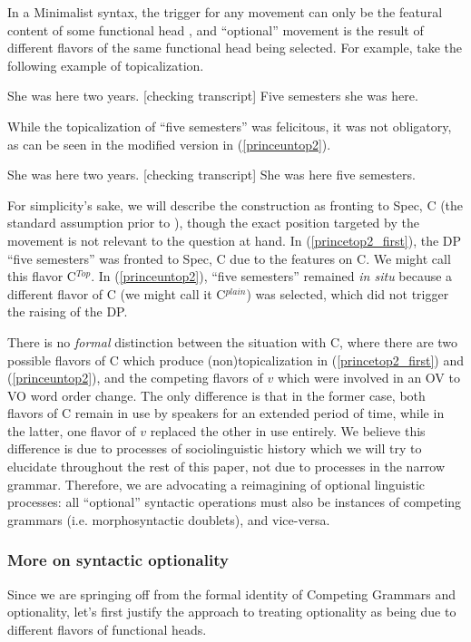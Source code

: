 In a Minimalist syntax, the trigger for any movement can only be the featural content of some functional head \citep{chomsky2000, chomsky2001}, and ``optional'' movement is the result of different flavors of the same functional head being selected.
For example, take the following example of topicalization.
\begin{exe}
\ex \label{princetop2_first} She was here two years.
[checking transcript] Five semesters she was here.\\
\citep[][8,9]{prince1999}
\end{exe}
While the topicalization of ``five semesters'' was felicitous, it was not obligatory, as can be seen in the modified version in (\ref{princeuntop2}).
\begin{exe}
\ex \label{princeuntop2} She was here two years.
[checking transcript] She was here five semesters.\\
\citep[Adapted from][8,9]{prince1999}
\end{exe}
For simplicity's sake, we will describe the construction as fronting to Spec, C (the standard assumption prior to \citealt{rizzi1997}), though the exact position targeted by the movement is not relevant to the question at hand.
In (\ref{princetop2_first}), the DP ``five semesters'' was fronted to Spec, C due to the features on C.
We might call this flavor C$^{Top}$.
In (\ref{princeuntop2}), ``five semesters'' remained \textsl{in situ} because a different flavor of C (we might call it C$^{plain}$) was selected, which did not trigger the raising of the DP.

There is no \emph{formal} distinction between the situation with C, where there are two possible flavors of C which produce (non)topicalization in (\ref{princetop2_first}) and (\ref{princeuntop2}), and the competing flavors of $v$ which were involved in an OV to VO word order change.
The only difference is that in the former case, both flavors of C remain in use by speakers for an extended period of time, while in the latter, one flavor of $v$ replaced the other in use entirely.
We believe this difference is due to processes of sociolinguistic history which we will try to elucidate throughout the rest of this paper, not due to processes in the narrow grammar.
Therefore, we are advocating a reimagining of optional linguistic processes: all ``optional'' syntactic operations must also be instances of competing grammars (i.e. morphosyntactic doublets), and vice-versa.

\subsubsection{More on syntactic optionality}
Since we are springing off from the formal identity of Competing Grammars and optionality, let's first justify the approach to treating optionality as being due to different flavors of functional heads.

